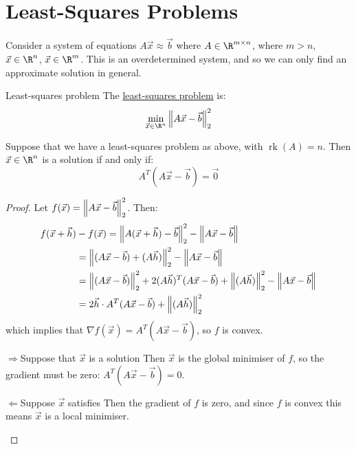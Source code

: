 \documentclass[../Main.tex]{subfiles}
\begin{document}
\section{Least-Squares Problems}
Consider a system of equations $A\vec{x} \approx \vec{b}$ where $A \in \R^{m \times n}$, where $m > n$, $\vec{x} \in \R^n$, $\vec{x} \in \R^m$. This is an overdetermined system, and so we can only find an approximate solution in general.
\begin{definition}{Least-squares problem}
    The \underline{least-squares problem} is:
    \begin{equation*}
        \min_{\vec{x} \in \R^n} \norm{A\vec{x} - \vec{b}}_2^2
    \end{equation*}
\end{definition}
\begin{theorem}
    Suppose that we have a least-squares problem as above, with $\operatorname{rk}(A) = n$. Then $\vec{x} \in \R^n$ is a solution if and only if:
    \begin{equation}
        A^T(A\vec{x} - \vec{b}) = \vec0
        \label{eqnNormalEqs}
    \end{equation}
    \label{thmLeastSquares}
\end{theorem}
\begin{proof}
    Let $f(\vec{x}) = \left\|A\vec{x} - \vec{b}\right\|_2^2$. Then:
    \begin{align*}
        f(\vec{x} + \vec{h}) &- f(\vec{x}) = \left\|A(\vec{x} + \vec{h}) - \vec{b}\right\|_2^2 - \left\|A\vec{x} - \vec{b}\right\|\\
        &= \left\|(A\vec{x} - \vec{b}) + (A\vec{h})\right\|_2^2 - \left\|A\vec{x} - \vec{b}\right\|\\
        &= \left\|(A\vec{x} - \vec{b})\right\|_2^2 + 2(A\vec{h})^T(A\vec{x} - \vec{b}) + \left\|(A\vec{h})\right\|_2^2 - \left\|A\vec{x} - \vec{b}\right\|\\
        &= 2\vec{h} \cdot A^T(A\vec{x} - \vec{b}) + \left\|(A\vec{h})\right\|_2^2
    \end{align*}
    which implies that $\nabla f(\vec{x}) = A^T(A\vec{x} - \vec{b})$, so $f$ is convex.
    \begin{proofdirection}{$\Rightarrow$}{Suppose that $\vec{x}$ is a solution}
        Then $\vec{x}$ is the global minimiser of $f$, so the gradient must be zero: $A^T(A\vec{x} - \vec{b}) = 0$.
    \end{proofdirection}
    \begin{proofdirection}{$\Leftarrow$}{Suppose $\vec{x}$ satisfies }
        Then the gradient of $f$ is zero, and since $f$ is convex this means $\vec{x}$ is a local minimiser.
    \end{proofdirection}
\end{proof}
\end{document}
